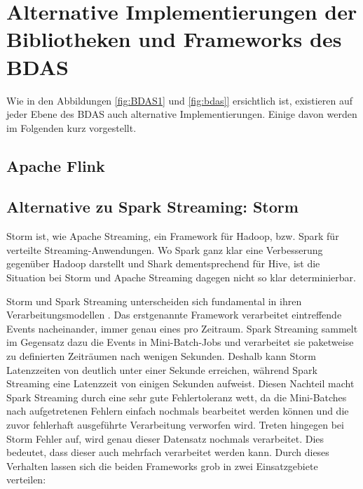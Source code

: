 \chapter{Alternative Implementierungen der Bibliotheken und Frameworks des BDAS}
\label{chapter:alternative implementierungen}








Wie in den Abbildungen \ref{fig:BDAS1} und \ref{fig:bdas]} ersichtlich ist, existieren auf jeder Ebene des BDAS auch alternative Implementierungen. Einige davon werden im Folgenden kurz vorgestellt. 


\section{Apache Flink}
\label{section:apache flink}





\section{Alternative zu Spark Streaming: Storm}
\label{section:storm}


Storm ist, wie Apache Streaming, ein Framework für Hadoop, bzw. Spark für verteilte Streaming-Anwendungen. Wo Spark ganz klar eine Verbesserung gegenüber Hadoop darstellt und Shark dementsprechend für Hive, ist die Situation bei Storm und Apache Streaming dagegen nicht so klar determinierbar. 

Storm und Spark Streaming unterscheiden sich fundamental in ihren Verarbeitungsmodellen . Das erstgenannte Framework verarbeitet eintreffende Events nacheinander, immer genau eines pro Zeitraum. Spark Streaming sammelt im Gegensatz dazu die Events in Mini-Batch-Jobs und verarbeitet sie paketweise zu definierten Zeiträumen nach wenigen Sekunden. Deshalb kann Storm Latenzzeiten von deutlich unter einer Sekunde erreichen, während Spark Streaming eine Latenzzeit von einigen Sekunden aufweist. Diesen Nachteil macht Spark Streaming durch eine sehr gute Fehlertoleranz wett, da die Mini-Batches nach aufgetretenen Fehlern einfach nochmals bearbeitet werden können und die zuvor fehlerhaft ausgeführte Verarbeitung verworfen wird. Treten hingegen bei Storm Fehler auf, wird genau dieser Datensatz nochmals verarbeitet. Dies bedeutet, dass dieser auch mehrfach verarbeitet werden kann. Durch dieses Verhalten lassen sich die beiden Frameworks grob in zwei Einsatzgebiete verteilen:

